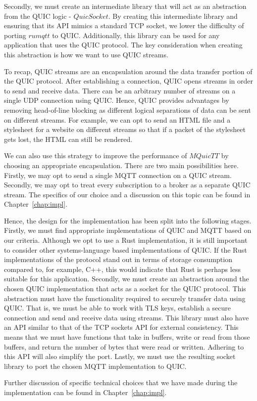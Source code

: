 Secondly, we must create an intermediate library that will act as an abstraction from the QUIC logic - $QuicSocket$.
By creating this intermediate library and ensuring that its API mimics a standard TCP socket, we lower the difficulty of porting $rumqtt$ to QUIC.
Additionally, this library can be used for any application that uses the QUIC protocol.
The key consideration when creating this abstraction is how we want to use QUIC streams.

To recap, QUIC streams are an encapsulation around the data transfer portion of the QUIC protocol.
After establishing a connection, QUIC opens streams in order to send and receive data.
There can be an arbitrary number of streams on a single UDP connection using QUIC.
Hence, QUIC provides advantages by removing head-of-line blocking as different logical separations of data can be sent on different streams.
For example, we can opt to send an HTML file and a stylesheet for a website on different streams so that if a packet of the stylesheet gets lost, the HTML can still be rendered.

We can also use this strategy to improve the performance of $MQuicTT$ by choosing an appropriate encapsulation.
There are two main possibilities here.
Firstly, we may opt to send a single MQTT connection on a QUIC stream.
Secondly, we may opt to treat every subscription to a broker as a separate QUIC stream.
The specifics of our choice and a discussion on this topic can be found in Chapter~\ref{chap:impl}.

Hence, the design for the implementation has been split into the following stages.
Firstly, we must find appropriate implementations of QUIC and MQTT based on our criteria.
Although we opt to use a Rust implementation, it is still important to consider other systems-language based implementations of QUIC.
If the Rust implementations of the protocol stand out in terms of storage consumption compared to, for example, C++, this would indicate that Rust is perhaps less suitable for this application.
Secondly, we must create an abstraction around the chosen QUIC implementation that acts as a socket for the QUIC protocol.
This abstraction must have the functionality required to securely transfer data using QUIC.
That is, we must be able to work with TLS keys, establish a secure connection and send and receive data using streams.
This library must also have an API similar to that of the TCP sockets API for external consistency.
This means that we must have functions that take in buffers, write or read from those buffers, and return the number of bytes that were read or written.
Adhering to this API will also simplify the port.
Lastly, we must use the resulting socket library to port the chosen MQTT implementation to QUIC.

Further discussion of specific technical choices that we have made during the implementation can be found in Chapter~\ref{chap:impl}.



